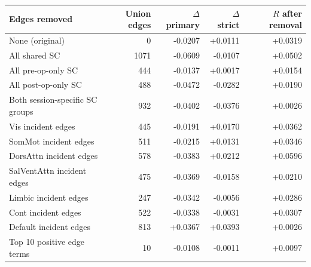 \begin{tabular}{lrrrr}
\toprule
Edges removed & Union edges & $\Delta$ primary & $\Delta$ strict & $R$ after removal \\
\midrule
None (original) & 0 & -0.0207 & +0.0111 & +0.0319 \\
All shared SC & 1071 & -0.0609 & -0.0107 & +0.0502 \\
All pre-op-only SC & 444 & -0.0137 & +0.0017 & +0.0154 \\
All post-op-only SC & 488 & -0.0472 & -0.0282 & +0.0190 \\
Both session-specific SC groups & 932 & -0.0402 & -0.0376 & +0.0026 \\
Vis incident edges & 445 & -0.0191 & +0.0170 & +0.0362 \\
SomMot incident edges & 511 & -0.0215 & +0.0131 & +0.0346 \\
DorsAttn incident edges & 578 & -0.0383 & +0.0212 & +0.0596 \\
SalVentAttn incident edges & 475 & -0.0369 & -0.0158 & +0.0210 \\
Limbic incident edges & 247 & -0.0342 & -0.0056 & +0.0286 \\
Cont incident edges & 522 & -0.0338 & -0.0031 & +0.0307 \\
Default incident edges & 813 & +0.0367 & +0.0393 & +0.0026 \\
Top 10 positive edge terms & 10 & -0.0108 & -0.0011 & +0.0097 \\
\bottomrule
\end{tabular}
